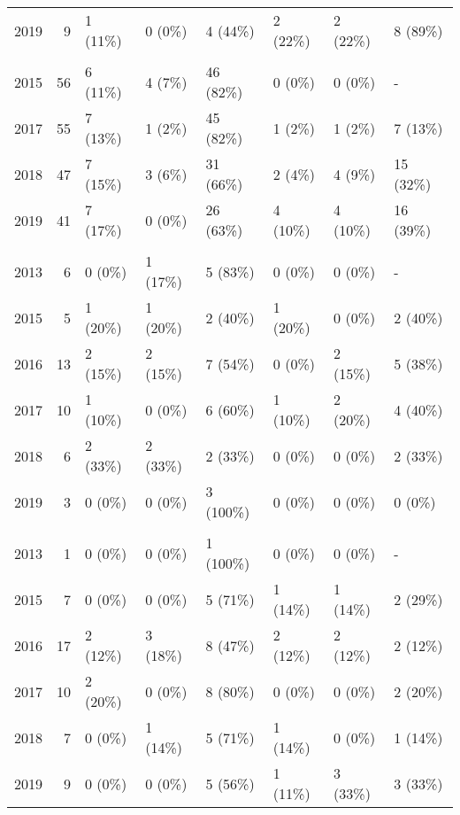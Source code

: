 \documentclass[
  american,
  ,man,floatsintext]{apa6}
\begin{document}
\begin{appendix}
\begin{longtable}[t]{lrllllll}
\hspace{1em}2019 & 9 & 1 (11\%) & 0 (0\%) & 4 (44\%) & 2 (22\%) & 2 (22\%) & 8 (89\%)\\
\addlinespace[0.3em]
\multicolumn{8}{l}{\textbf{Strack}}\\
\hspace{1em}2015 & 56 & 6 (11\%) & 4 (7\%) & 46 (82\%) & 0 (0\%) & 0 (0\%) & -\\
\hspace{1em}2017 & 55 & 7 (13\%) & 1 (2\%) & 45 (82\%) & 1 (2\%) & 1 (2\%) & 7 (13\%)\\
\hspace{1em}2018 & 47 & 7 (15\%) & 3 (6\%) & 31 (66\%) & 2 (4\%) & 4 (9\%) & 15 (32\%)\\
\hspace{1em}2019 & 41 & 7 (17\%) & 0 (0\%) & 26 (63\%) & 4 (10\%) & 4 (10\%) & 16 (39\%)\\
\addlinespace[0.3em]
\multicolumn{8}{l}{\textbf{Carter}}\\
\hspace{1em}2013 & 6 & 0 (0\%) & 1 (17\%) & 5 (83\%) & 0 (0\%) & 0 (0\%) & -\\
\hspace{1em}2015 & 5 & 1 (20\%) & 1 (20\%) & 2 (40\%) & 1 (20\%) & 0 (0\%) & 2 (40\%)\\
\hspace{1em}2016 & 13 & 2 (15\%) & 2 (15\%) & 7 (54\%) & 0 (0\%) & 2 (15\%) & 5 (38\%)\\
\hspace{1em}2017 & 10 & 1 (10\%) & 0 (0\%) & 6 (60\%) & 1 (10\%) & 2 (20\%) & 4 (40\%)\\
\hspace{1em}2018 & 6 & 2 (33\%) & 2 (33\%) & 2 (33\%) & 0 (0\%) & 0 (0\%) & 2 (33\%)\\
\hspace{1em}2019 & 3 & 0 (0\%) & 0 (0\%) & 3 (100\%) & 0 (0\%) & 0 (0\%) & 0 (0\%)\\
\addlinespace[0.3em]
\multicolumn{8}{l}{\textbf{Caruso}}\\
\hspace{1em}2013 & 1 & 0 (0\%) & 0 (0\%) & 1 (100\%) & 0 (0\%) & 0 (0\%) & -\\
\hspace{1em}2015 & 7 & 0 (0\%) & 0 (0\%) & 5 (71\%) & 1 (14\%) & 1 (14\%) & 2 (29\%)\\
\hspace{1em}2016 & 17 & 2 (12\%) & 3 (18\%) & 8 (47\%) & 2 (12\%) & 2 (12\%) & 2 (12\%)\\
\hspace{1em}2017 & 10 & 2 (20\%) & 0 (0\%) & 8 (80\%) & 0 (0\%) & 0 (0\%) & 2 (20\%)\\
\hspace{1em}2018 & 7 & 0 (0\%) & 1 (14\%) & 5 (71\%) & 1 (14\%) & 0 (0\%) & 1 (14\%)\\
\hspace{1em}2019 & 9 & 0 (0\%) & 0 (0\%) & 5 (56\%) & 1 (11\%) & 3 (33\%) & 3 (33\%)\\
\bottomrule
\end{longtable}


\end{appendix}
\end{document}
